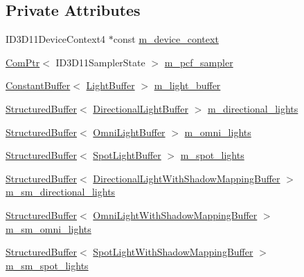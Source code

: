 \subsection*{Private Attributes}
\begin{DoxyCompactItemize}
\item 
I\+D3\+D11\+Device\+Context4 $\ast$const \hyperlink{structmage_1_1_l_buffer_pass_aa3f3eb2e2e4303398553eb9f07344845}{m\+\_\+device\+\_\+context}
\item 
\hyperlink{namespacemage_ae74f374780900893caa5555d1031fd79}{Com\+Ptr}$<$ I\+D3\+D11\+Sampler\+State $>$ \hyperlink{structmage_1_1_l_buffer_pass_aaf8dacd30171f31fe2a898fbdd91a990}{m\+\_\+pcf\+\_\+sampler}
\item 
\hyperlink{structmage_1_1_constant_buffer}{Constant\+Buffer}$<$ \hyperlink{structmage_1_1_light_buffer}{Light\+Buffer} $>$ \hyperlink{structmage_1_1_l_buffer_pass_a5946e3e691734567824644f8d1ec77b9}{m\+\_\+light\+\_\+buffer}
\item 
\hyperlink{structmage_1_1_structured_buffer}{Structured\+Buffer}$<$ \hyperlink{structmage_1_1_directional_light_buffer}{Directional\+Light\+Buffer} $>$ \hyperlink{structmage_1_1_l_buffer_pass_a90327556a34fe3a56e6980accead0c44}{m\+\_\+directional\+\_\+lights}
\item 
\hyperlink{structmage_1_1_structured_buffer}{Structured\+Buffer}$<$ \hyperlink{structmage_1_1_omni_light_buffer}{Omni\+Light\+Buffer} $>$ \hyperlink{structmage_1_1_l_buffer_pass_afc2754b9d3a3b1c2171cd1a6e5b2349d}{m\+\_\+omni\+\_\+lights}
\item 
\hyperlink{structmage_1_1_structured_buffer}{Structured\+Buffer}$<$ \hyperlink{structmage_1_1_spot_light_buffer}{Spot\+Light\+Buffer} $>$ \hyperlink{structmage_1_1_l_buffer_pass_af1612aa2a8d24303ebcf9e72125698f3}{m\+\_\+spot\+\_\+lights}
\item 
\hyperlink{structmage_1_1_structured_buffer}{Structured\+Buffer}$<$ \hyperlink{structmage_1_1_directional_light_with_shadow_mapping_buffer}{Directional\+Light\+With\+Shadow\+Mapping\+Buffer} $>$ \hyperlink{structmage_1_1_l_buffer_pass_ad9a714aed008db64b5a7d9be1a5f741c}{m\+\_\+sm\+\_\+directional\+\_\+lights}
\item 
\hyperlink{structmage_1_1_structured_buffer}{Structured\+Buffer}$<$ \hyperlink{structmage_1_1_omni_light_with_shadow_mapping_buffer}{Omni\+Light\+With\+Shadow\+Mapping\+Buffer} $>$ \hyperlink{structmage_1_1_l_buffer_pass_aa5fa46c76d4d7d58141eeb021bb9f20c}{m\+\_\+sm\+\_\+omni\+\_\+lights}
\item 
\hyperlink{structmage_1_1_structured_buffer}{Structured\+Buffer}$<$ \hyperlink{structmage_1_1_spot_light_with_shadow_mapping_buffer}{Spot\+Light\+With\+Shadow\+Mapping\+Buffer} $>$ \hyperlink{structmage_1_1_l_buffer_pass_a5630c1edc1d0833d08e0350bef5ec8a5}{m\+\_\+sm\+\_\+spot\+\_\+lights}

\end{DoxyCompactItemize}

